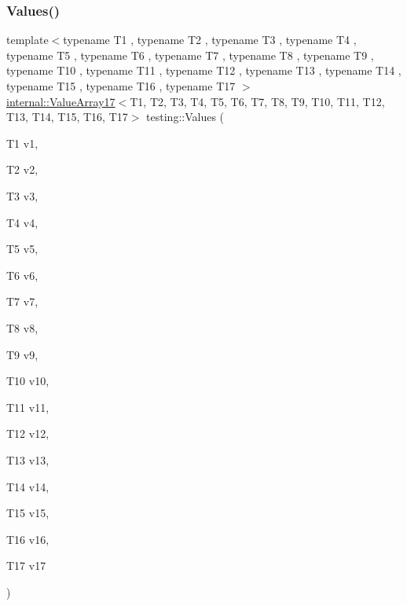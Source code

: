 \subsubsection{\texorpdfstring{Values()}{Values()}\hspace{0.1cm}{\footnotesize\ttfamily [17/50]}}
{\footnotesize\ttfamily template$<$typename T1 , typename T2 , typename T3 , typename T4 , typename T5 , typename T6 , typename T7 , typename T8 , typename T9 , typename T10 , typename T11 , typename T12 , typename T13 , typename T14 , typename T15 , typename T16 , typename T17 $>$ \\
\mbox{\hyperlink{classtesting_1_1internal_1_1ValueArray17}{internal\+::\+Value\+Array17}}$<$T1, T2, T3, T4, T5, T6, T7, T8, T9, T10, T11, T12, T13, T14, T15, T16, T17$>$ testing\+::\+Values (\begin{DoxyParamCaption}\item[{T1}]{v1,  }\item[{T2}]{v2,  }\item[{T3}]{v3,  }\item[{T4}]{v4,  }\item[{T5}]{v5,  }\item[{T6}]{v6,  }\item[{T7}]{v7,  }\item[{T8}]{v8,  }\item[{T9}]{v9,  }\item[{T10}]{v10,  }\item[{T11}]{v11,  }\item[{T12}]{v12,  }\item[{T13}]{v13,  }\item[{T14}]{v14,  }\item[{T15}]{v15,  }\item[{T16}]{v16,  }\item[{T17}]{v17 }\end{DoxyParamCaption})}

\mbox{\label{namespacetesting_ab442a00c98b4bfb3bfa81f5e06bf53f9}} 
